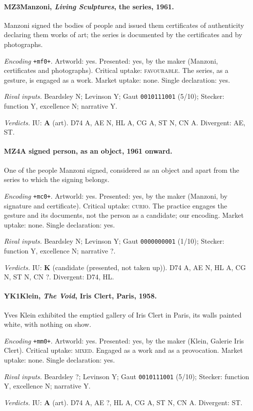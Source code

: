 \paragraph{MZ3\enspace Manzoni, \emph{Living Sculptures}, the series, 1961.}
Manzoni signed the bodies of people and issued them certificates of authenticity declaring them works of art; the series is documented by the certificates and by photographs.\par
\noindent\textit{Encoding} \texttt{+mf0+}. Artworld: yes. Presented: yes, by the maker (Manzoni, certificates and photographs). Critical uptake: \textsc{favourable}. The series, as a gesture, is engaged as a work. Market uptake: none. Single declaration: yes.\par
\noindent\textit{Rival inputs.} Beardsley N; Levinson Y; Gaut \texttt{0010111001} (5/10); Stecker: function Y, excellence N; narrative Y.\par
\noindent\textit{Verdicts.} IU: \textbf{A} (art). D74 A, AE N, HL A, CG A, ST N, CN A. Divergent: AE, ST.\par

\paragraph{MZ4\enspace A signed person, as an object, 1961 onward.}
One of the people Manzoni signed, considered as an object and apart from the series to which the signing belongs.\par
\noindent\textit{Encoding} \texttt{+mc0+}. Artworld: yes. Presented: yes, by the maker (Manzoni, by signature and certificate). Critical uptake: \textsc{curio}. The practice engages the gesture and its documents, not the person as a candidate; our encoding. Market uptake: none. Single declaration: yes.\par
\noindent\textit{Rival inputs.} Beardsley N; Levinson Y; Gaut \texttt{0000000001} (1/10); Stecker: function Y, excellence N; narrative ?.\par
\noindent\textit{Verdicts.} IU: \textbf{K} (candidate (presented, not taken up)). D74 A, AE N, HL A, CG N, ST N, CN ?. Divergent: D74, HL.\par

\paragraph{YK1\enspace Klein, \emph{The Void}, Iris Clert, Paris, 1958.}
Yves Klein exhibited the emptied gallery of Iris Clert in Paris, its walls painted white, with nothing on show.\par
\noindent\textit{Encoding} \texttt{+mm0+}. Artworld: yes. Presented: yes, by the maker (Klein, Galerie Iris Clert). Critical uptake: \textsc{mixed}. Engaged as a work and as a provocation. Market uptake: none. Single declaration: yes.\par
\noindent\textit{Rival inputs.} Beardsley ?; Levinson Y; Gaut \texttt{0010111001} (5/10); Stecker: function Y, excellence N; narrative Y.\par
\noindent\textit{Verdicts.} IU: \textbf{A} (art). D74 A, AE ?, HL A, CG A, ST N, CN A. Divergent: ST.\par

